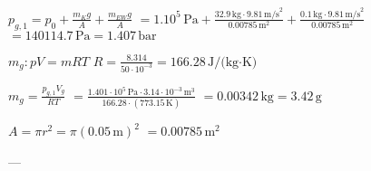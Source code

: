 \( p_{g,1} = p_0 + \frac{m_K g}{A} + \frac{m_{EW} g}{A} \)  
\( = 1.10^5 \, \text{Pa} + \frac{32.9 \, \text{kg} \cdot 9.81 \, \text{m/s}^2}{0.00785 \, \text{m}^2} + \frac{0.1 \, \text{kg} \cdot 9.81 \, \text{m/s}^2}{0.00785 \, \text{m}^2} \)  
\( = 140114.7 \, \text{Pa} = 1.407 \, \text{bar} \)  

\( m_g: pV = mRT \)  
\( R = \frac{8.314}{50 \cdot 10^{-3}} = 166.28 \, \text{J/(kg·K)} \)  

\( m_g = \frac{p_{g,1} V_g}{RT} \)  
\( = \frac{1.401 \cdot 10^5 \, \text{Pa} \cdot 3.14 \cdot 10^{-3} \, \text{m}^3}{166.28 \cdot (773.15 \, \text{K})} \)  
\( = 0.00342 \, \text{kg} = 3.42 \, \text{g} \)  

\( A = \pi r^2 = \pi (0.05 \, \text{m})^2 \)  
\( = 0.00785 \, \text{m}^2 \)  

---
